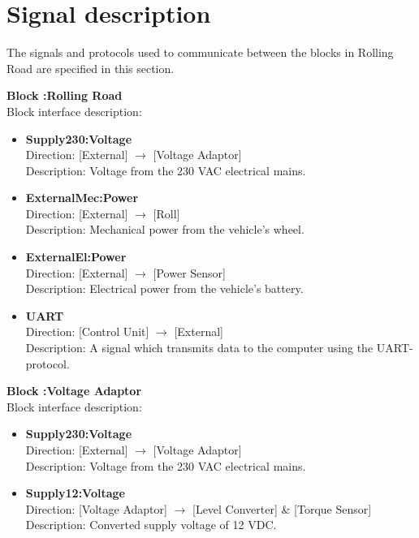  \section{Signal description}
The signals and protocols used to communicate between the blocks in Rolling Road are specified in this section.



\textbf{Block :Rolling Road}\\
Block interface description:
\begin{itemize}
	\item \textbf{Supply230:Voltage}\\
	Direction: [External] $\rightarrow$ [Voltage Adaptor]\\
	Description: Voltage from the 230 VAC electrical mains.
	\item \textbf{ExternalMec:Power}\\
	Direction: [External] $\rightarrow$ [Roll]\\
	Description: Mechanical power from the vehicle's wheel.
	\item \textbf{ExternalEl:Power}\\
	Direction: [External] $\rightarrow$ [Power Sensor]\\
	Description: Electrical power from the vehicle's battery.
	\item \textbf{UART}\\
	Direction: [Control Unit] $\rightarrow$ [External]\\
	Description: A signal which transmits data to the computer using the UART-protocol.
\end{itemize}
	
\textbf{Block :Voltage Adaptor}\\
Block interface description:
\begin{itemize}
	\item \textbf{Supply230:Voltage}\\
	Direction: [External] $\rightarrow$ [Voltage Adaptor]\\
	Description: Voltage from the 230 VAC electrical mains.
	\item \textbf{Supply12:Voltage}\\
	Direction: [Voltage Adaptor] $\rightarrow$ [Level Converter] \& [Torque Sensor]\\
	Description: Converted supply voltage of 12 VDC.
\end{itemize}
		
